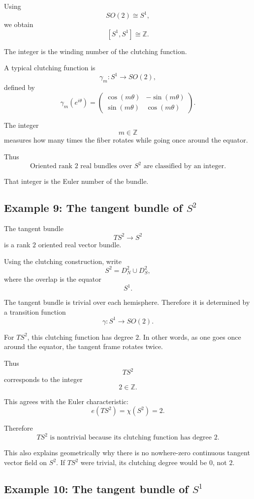\documentclass[12pt,a4paper]{article}
\theoremstyle{notespace}
\begin{document}
Using
\[
SO(2)\cong S^1,
\]
we obtain
\[
[S^1,S^1]\cong \mathbb{Z}.
\]

The integer is the winding number of the clutching function.

A typical clutching function is
\[
\gamma_m:S^1\to SO(2),
\]
defined by
\[
\gamma_m(e^{i\theta})
=
\begin{pmatrix}
	\cos(m\theta)&-\sin(m\theta)\\
	\sin(m\theta)&\cos(m\theta)
\end{pmatrix}.
\]

The integer
\[
m\in \mathbb{Z}
\]
measures how many times the fiber rotates while going once around the equator.

Thus
\[
\boxed{
	\text{Oriented rank }2\text{ real bundles over }S^2
	\text{ are classified by an integer.}
}
\]

That integer is the Euler number of the bundle.

\subsection{Example 9: The tangent bundle of \(S^2\)}

The tangent bundle
\[
TS^2\to S^2
\]
is a rank \(2\) oriented real vector bundle.

Using the clutching construction, write
\[
S^2=D_N^2\cup D_S^2,
\]
where the overlap is the equator
\[
S^1.
\]

The tangent bundle is trivial over each hemisphere. Therefore it is determined by a transition function
\[
\gamma:S^1\to SO(2).
\]

For \(TS^2\), this clutching function has degree \(2\). In other words, as one goes once around the equator, the tangent frame rotates twice.

Thus
\[
TS^2
\]
corresponds to the integer
\[
2\in \mathbb{Z}.
\]

This agrees with the Euler characteristic:
\[
e(TS^2)=\chi(S^2)=2.
\]

Therefore
\[
\boxed{
	TS^2\text{ is nontrivial because its clutching function has degree }2.
}
\]

This also explains geometrically why there is no nowhere-zero continuous tangent vector field on \(S^2\). If \(TS^2\) were trivial, its clutching degree would be \(0\), not \(2\).

\subsection{Example 10: The tangent bundle of \(S^1\)}
\end{document}
